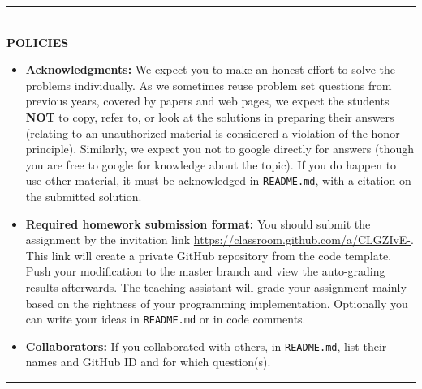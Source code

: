 \vspace{3em}

\rule{\textwidth}{1pt}
\\
\textbf{POLICIES}
\begin{itemize}
\item {\bf Acknowledgments: \/} 
  We expect you to make an honest effort to solve the problems individually.  As we sometimes reuse problem set questions from previous years, covered by papers and web pages, we expect the students \textbf{NOT} to copy, refer to, or look at the solutions in preparing their answers (relating to an unauthorized material is considered a violation of the honor principle). Similarly, we expect you not to google directly for answers (though you are free to google for knowledge about the topic). If you do happen to use other material, it must be acknowledged in \texttt{README.md}, with a citation on the submitted solution.
  
\item {\bf Required homework submission format: \/}
  You should submit the assignment by the invitation link \url{https://classroom.github.com/a/CLGZIvE-}. This link will create a private GitHub repository from the code template.
  Push your modification to the master branch and view the auto-grading results afterwards. The teaching assistant will grade your
  assignment mainly based on the rightness of your programming implementation.
  Optionally you can write your ideas in \texttt{README.md} or in code comments.
  

\item {\bf Collaborators: \/}
If you collaborated with others, in \texttt{README.md}, list their names and GitHub ID and for which question(s).
\end{itemize}
\rule{\textwidth}{1pt}
